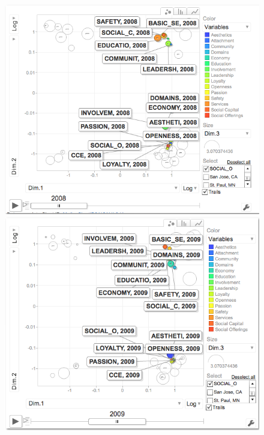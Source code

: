 \documentclass[11pt]{asaproc}
\begin{document}
\begin{figure}[h]
\begin{framed}
\begin{minipage}[b]{0.45\linewidth}
\centering
\includegraphics[width=\textwidth]{pcameans08.png}
\end{minipage}
\hspace{0.5cm}
\begin{minipage}[b]{0.45\linewidth}
\centering
\includegraphics[width=\textwidth]{pcameans09.png}
\end{minipage}

\end{framed}
\end{figure}
\end{document}
